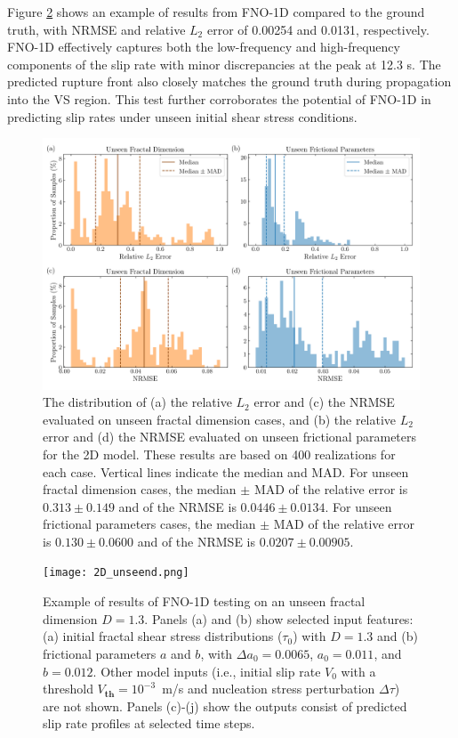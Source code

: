 \documentclass[draft]{agujournal2019}
\begin{document}
Figure \ref{fig:2D_unseen_d} shows an example of results from FNO-1D compared to the ground truth, with NRMSE and relative \(L_2\) error of 0.00254 and 0.0131, respectively. FNO-1D effectively captures both the low-frequency and high-frequency components of the slip rate with minor discrepancies at the peak at 12.3 s. The predicted rupture front also closely matches the ground truth during propagation into the VS region.  This test further corroborates the potential of FNO-1D in predicting slip rates under unseen initial shear stress conditions.

\begin{figure}
\centering
\includegraphics[width=1.0\linewidth]{2D_hist_unseen_2.png}
\caption{\label{fig:2D_hist_unseen}The distribution of (a) the relative \(L_2\) error and (c) the NRMSE evaluated on unseen fractal dimension cases, and (b) the relative \(L_2\) error and (d) the NRMSE evaluated on unseen frictional parameters for the 2D model. These results are based on 400 realizations for each case. Vertical lines indicate the median and MAD. For unseen fractal dimension cases, the median \(\pm\) MAD of the relative error is \(0.313 \pm 0.149\) and of the NRMSE is \(0.0446 \pm 0.0134\). For unseen frictional parameters cases, the median \(\pm\) MAD of the relative error is \(0.130 \pm 0.0600\) and of the NRMSE is \(0.0207 \pm 0.00905\).
}
\end{figure}

\begin{figure}
\centering
\texttt{[image: 2D\_unseend.png]}
\caption{\label{fig:2D_unseen_d}Example of results of FNO-1D testing on an unseen fractal dimension \(D = 1.3\). Panels (a) and (b) show selected input features: (a) initial fractal shear stress distributions (\(\tau_{0}\)) with \(D = 1.3\) and (b) frictional parameters \(a\) and \(b\), with \(\Delta a_{0} = 0.0065\), \(a_{0} = 0.011\), and \(b = 0.012\). Other model inputs (i.e., initial slip rate \(V_0\) with a threshold \(V_\textbf{th} = 10^{-3}\)~m/s and nucleation stress perturbation \(\Delta \tau\)) are not shown. Panels (c)-(j) show the outputs consist of predicted slip rate profiles at selected time steps.
}
\end{figure}
\end{document}
